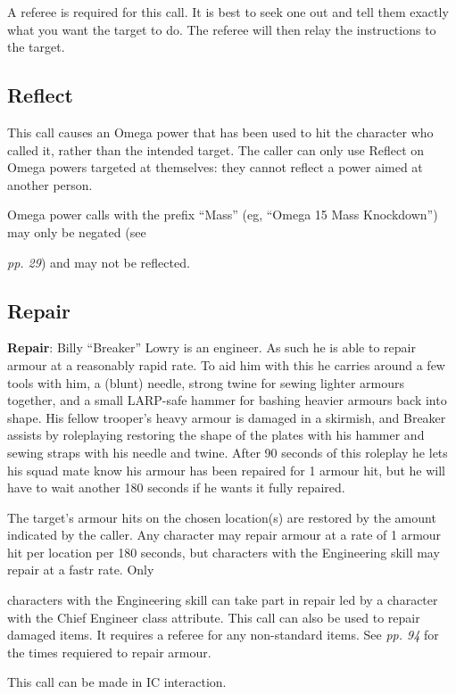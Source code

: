 \documentclass{scrbook}
\begin{document}
A referee is required for this call. It is best to seek one out and tell them exactly what you want the target to do. The referee will then relay the instructions to the target.

\subsection{Reflect}

This call causes an Omega power that has been used to hit the character who called it, rather than the intended target. The caller can only use Reflect on Omega powers targeted at themselves: they cannot reflect a power aimed at another person.

Omega power calls with the prefix ``Mass'' (eg, ``Omega 15 Mass Knockdown'') may only be negated (see

\textit{pp. 29}) and may not be reflected.

\subsection{Repair}

\textbf{Repair}: Billy ``Breaker'' Lowry is an engineer. As such he is able to repair armour at a reasonably rapid rate. To aid him with this he carries around a few tools with him, a (blunt) needle, strong twine for sewing lighter armours together, and a small LARP-safe hammer for bashing heavier armours back into shape. His fellow trooper's heavy armour is damaged in a skirmish, and Breaker assists by roleplaying restoring the shape of the plates with his hammer and sewing straps with his needle and twine. After 90 seconds of this roleplay he lets his squad mate know his armour has been repaired for 1 armour hit, but he will have to wait another 180 seconds if he wants it fully repaired.

The target's armour hits on the chosen location(s) are restored by the amount indicated by the caller. Any character may repair armour at a rate of 1 armour hit per location per 180 seconds, but characters with the Engineering skill may repair at a fastr rate. Only

characters with the Engineering skill can take part in repair led by a character with the Chief Engineer class attribute. This call can also be used to repair damaged items. It requires a referee for any non-standard items. See \textit{pp. 94} for the times requiered to repair armour.

This call can be made in IC interaction.
\end{document}
